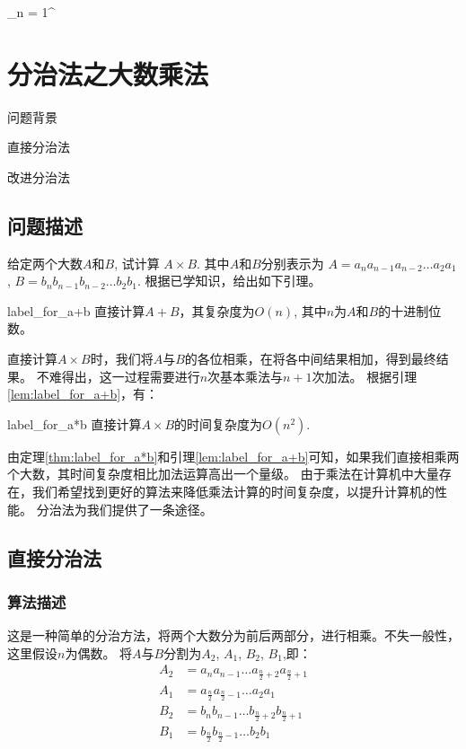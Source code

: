 \sum_{n = 1}^{\infty}  \chapter{分治法之大数乘法}
\begin{introduction}
	\item 问题背景
	\item 直接分治法
	\item 改进分治法
\end{introduction}

\section{问题描述}
给定两个大数$A$和$B$, 试计算
\begin{math}
	A \times B
\end{math}.
其中$A$和$B$分别表示为
\begin{math}
	A = a_n a_{n-1} a_{n-2} \ldots a_2 a_1
\end{math}
,
\begin{math}
	B = b_n b_{n-1} b_{n-2} \ldots b_2 b_1
\end{math}.
根据已学知识，给出如下引理。

\begin{lemma}{}{label_for_a+b}
	直接计算$A + B$，其复杂度为$O(n)$, 其中$n$为$A$和$B$的十进制位数。
\end{lemma}

直接计算$A \times B$时，我们将$A$与$B$的各位相乘，在将各中间结果相加，得到最终结果。
不难得出，这一过程需要进行$n$次基本乘法与$n+1$次加法。
根据引理\ref{lem:label_for_a+b}，有：
\begin{theorem}{}{label_for_a*b}
	直接计算$A \times B$的时间复杂度为$O(n^2)$.
\end{theorem}

由定理\ref{thm:label_for_a*b}和引理\ref{lem:label_for_a+b}可知，如果我们直接相乘两个大数，其时间复杂度相比加法运算高出一个量级。
由于乘法在计算机中大量存在，我们希望找到更好的算法来降低乘法计算的时间复杂度，以提升计算机的性能。
分治法为我们提供了一条途径。
\section{直接分治法}
\subsection{算法描述}
这是一种简单的分治方法，将两个大数分为前后两部分，进行相乘。不失一般性，这里假设$n$为偶数。
将$A$与$B$分割为$A_2$, $A_1$, $B_2$, $B_1$,即：
\begin{displaymath}
	\begin{split}
		A_2 &= a_{n} a_{n-1} \ldots a_{\frac{n}{2} + 2} a_{\frac{n}{2} + 1}\\
		A_1 &= a_{\frac{n}{2}} a_{\frac{n}{2} - 1} \ldots a_2 a_1\\
		B_2 &= b_{n} b_{n-1} \ldots b_{\frac{n}{2} + 2} b_{\frac{n}{2} + 1}\\
		B_1 &= b_{\frac{n}{2}} b_{\frac{n}{2} - 1} \ldots b_2 b_1
	\end{split}
\end{displaymath}

